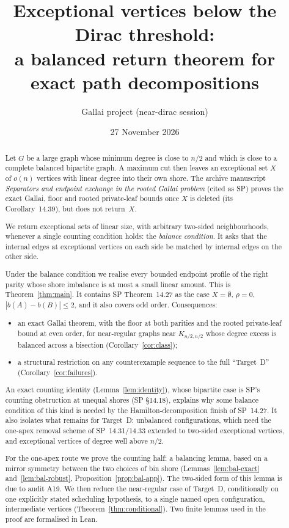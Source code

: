 \documentclass[11pt]{article}
\title{Exceptional vertices below the Dirac threshold:\\ a balanced return theorem for exact path decompositions}
\author{Gallai project (near-dirac session)}
\date{27 November 2026}
\theoremstyle{definition}
\begin{document}
\maketitle

\begin{abstract}
Let $G$ be a large graph whose minimum degree is close to $n/2$ and which is close to a complete balanced bipartite graph. A maximum cut then leaves an exceptional set $X$ of $o(n)$ vertices with linear degree into their own shore. The archive manuscript \emph{Separators and endpoint exchange in the rooted Gallai problem} (cited as SP) proves the exact Gallai, floor and rooted private-leaf bounds once $X$ is deleted (its Corollary~14.39), but does not return~$X$.

We return exceptional sets of linear size, with arbitrary two-sided neighbourhoods, whenever a single counting condition holds: the \emph{balance condition}. It asks that the internal edges at exceptional vertices on each side be matched by internal edges on the other side.

Under the balance condition we realise every bounded endpoint profile of the right parity whose shore imbalance is at most a small linear amount. This is Theorem~\ref{thm:main}. It contains SP Theorem~14.27 as the case $X=\emptyset$, $\rho=0$, $|b(A)-b(B)|\le2$, and it also covers odd order. Consequences:
\begin{itemize}[nosep]
\item an exact Gallai theorem, with the floor at both parities and the rooted private-leaf bound at even order, for near-regular graphs near $K_{n/2,n/2}$ whose degree excess is balanced across a bisection (Corollary~\ref{cor:class});
\item a structural restriction on any counterexample sequence to the full ``Target~D'' (Corollary~\ref{cor:failures}).
\end{itemize}
An exact counting identity (Lemma~\ref{lem:identity}), whose bipartite case is SP's counting obstruction at unequal shores (SP \S14.18), explains why some balance condition of this kind is needed by the Hamilton-decomposition finish of SP~14.27. It also isolates what remains for Target~D: unbalanced configurations, which need the one-apex removal scheme of SP~14.31/14.33 extended to two-sided exceptional vertices, and exceptional vertices of degree well above $n/2$.

For the one-apex route we prove the counting half: a balancing lemma, based on a mirror symmetry between the two choices of bin shore (Lemmas~\ref{lem:bal-exact} and~\ref{lem:bal-robust}, Proposition~\ref{prop:bal-app}). The two-sided form of this lemma is due to audit A19. We then reduce the near-regular case of Target~D, conditionally on one explicitly stated scheduling hypothesis, to a single named open configuration, intermediate vertices (Theorem~\ref{thm:conditional}). Two finite lemmas used in the proof are formalised in Lean.
\end{abstract}
\end{document}
